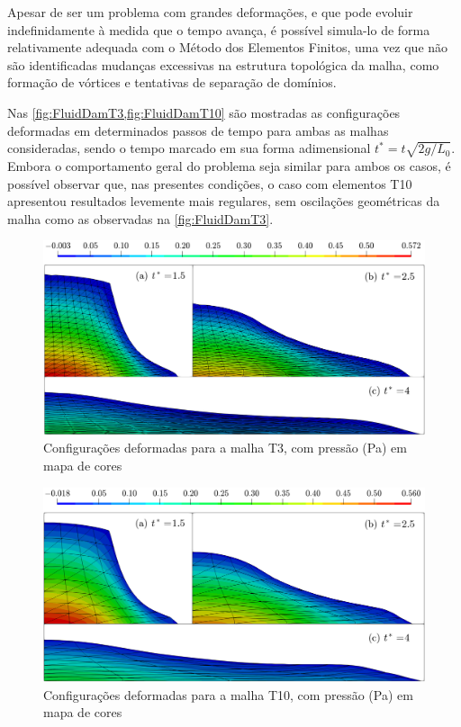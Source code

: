 \documentclass[Tese.tex]{subfiles}
\begin{document}
Apesar de ser um problema com grandes deformações, e que pode evoluir indefinidamente à medida que o tempo avança, é possível simula-lo de forma relativamente adequada com o Método dos Elementos Finitos, uma vez que não são identificadas mudanças excessivas na estrutura topológica da malha, como formação de vórtices e tentativas de separação de domínios. 

Nas \cref{fig:FluidDamT3,fig:FluidDamT10} são mostradas as configurações deformadas em determinados passos de tempo para ambas as malhas consideradas, sendo o tempo marcado em sua forma adimensional $t^* = t\sqrt{2g/L_0}$. Embora o comportamento geral do problema seja similar para ambos os casos, é possível observar que, nas presentes condições, o caso com elementos T10 apresentou resultados levemente mais regulares, sem oscilações geométricas da malha como as observadas na \autoref{fig:FluidDamT3}.

\begin{figure}[!htb]
	\centering
	\caption{Configurações deformadas para a malha T3, com pressão (Pa) em mapa de cores}
	\label{fig:FluidDamT3}
	\includegraphics[scale=0.4]{Figuras/FluidDam/FluidDamT3.png}
\end{figure}

\begin{figure}[!htb]
	\centering
	\caption{Configurações deformadas para a malha T10, com pressão (Pa) em mapa de cores}
	\label{fig:FluidDamT10}
	\includegraphics[scale=0.4]{Figuras/FluidDam/FluidDamT10.png}
\end{figure}
\end{document}
